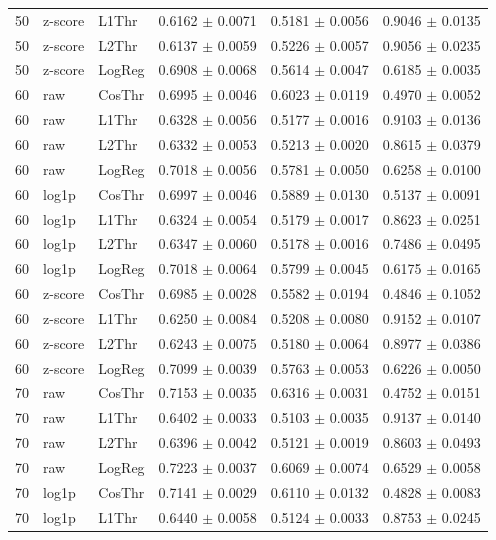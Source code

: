 \begin{longtable}{rllccc}
50 & z-score & L1Thr & 0.6162 $\pm$ 0.0071 & 0.5181 $\pm$ 0.0056 & 0.9046 $\pm$ 0.0135 \\
50 & z-score & L2Thr & 0.6137 $\pm$ 0.0059 & 0.5226 $\pm$ 0.0057 & 0.9056 $\pm$ 0.0235 \\
50 & z-score & LogReg & 0.6908 $\pm$ 0.0068 & 0.5614 $\pm$ 0.0047 & 0.6185 $\pm$ 0.0035 \\
60 & raw & CosThr & 0.6995 $\pm$ 0.0046 & 0.6023 $\pm$ 0.0119 & 0.4970 $\pm$ 0.0052 \\
60 & raw & L1Thr & 0.6328 $\pm$ 0.0056 & 0.5177 $\pm$ 0.0016 & 0.9103 $\pm$ 0.0136 \\
60 & raw & L2Thr & 0.6332 $\pm$ 0.0053 & 0.5213 $\pm$ 0.0020 & 0.8615 $\pm$ 0.0379 \\
60 & raw & LogReg & 0.7018 $\pm$ 0.0056 & 0.5781 $\pm$ 0.0050 & 0.6258 $\pm$ 0.0100 \\
60 & log1p & CosThr & 0.6997 $\pm$ 0.0046 & 0.5889 $\pm$ 0.0130 & 0.5137 $\pm$ 0.0091 \\
60 & log1p & L1Thr & 0.6324 $\pm$ 0.0054 & 0.5179 $\pm$ 0.0017 & 0.8623 $\pm$ 0.0251 \\
60 & log1p & L2Thr & 0.6347 $\pm$ 0.0060 & 0.5178 $\pm$ 0.0016 & 0.7486 $\pm$ 0.0495 \\
60 & log1p & LogReg & 0.7018 $\pm$ 0.0064 & 0.5799 $\pm$ 0.0045 & 0.6175 $\pm$ 0.0165 \\
60 & z-score & CosThr & 0.6985 $\pm$ 0.0028 & 0.5582 $\pm$ 0.0194 & 0.4846 $\pm$ 0.1052 \\
60 & z-score & L1Thr & 0.6250 $\pm$ 0.0084 & 0.5208 $\pm$ 0.0080 & 0.9152 $\pm$ 0.0107 \\
60 & z-score & L2Thr & 0.6243 $\pm$ 0.0075 & 0.5180 $\pm$ 0.0064 & 0.8977 $\pm$ 0.0386 \\
60 & z-score & LogReg & 0.7099 $\pm$ 0.0039 & 0.5763 $\pm$ 0.0053 & 0.6226 $\pm$ 0.0050 \\
70 & raw & CosThr & 0.7153 $\pm$ 0.0035 & 0.6316 $\pm$ 0.0031 & 0.4752 $\pm$ 0.0151 \\
70 & raw & L1Thr & 0.6402 $\pm$ 0.0033 & 0.5103 $\pm$ 0.0035 & 0.9137 $\pm$ 0.0140 \\
70 & raw & L2Thr & 0.6396 $\pm$ 0.0042 & 0.5121 $\pm$ 0.0019 & 0.8603 $\pm$ 0.0493 \\
70 & raw & LogReg & 0.7223 $\pm$ 0.0037 & 0.6069 $\pm$ 0.0074 & 0.6529 $\pm$ 0.0058 \\
70 & log1p & CosThr & 0.7141 $\pm$ 0.0029 & 0.6110 $\pm$ 0.0132 & 0.4828 $\pm$ 0.0083 \\
70 & log1p & L1Thr & 0.6440 $\pm$ 0.0058 & 0.5124 $\pm$ 0.0033 & 0.8753 $\pm$ 0.0245 \\

\end{longtable}
